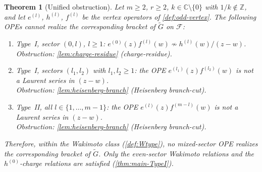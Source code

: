 \documentclass[12pt]{article}
\theoremstyle{plain}
\newtheorem{theorem}{Theorem}[section]
\theoremstyle{definition}
\theoremstyle{remark}
\newcommand{\C}{\mathbb{C}}
\newcommand{\el}[1]{e^{(#1)}}
\newcommand{\hl}[1]{h^{(#1)}}
\newcommand{\fl}[1]{f^{(#1)}}
\newcommand{\OPE}{\sim}
\begin{document}
\begin{theorem}[Unified obstruction]
\label{thm:unified-nogo}
  Let $m\geq 2$, $r\geq 2$, $k\in\C\setminus\{0\}$ with $1/k\notin\mathbb{Z}$,
  and let $\el{l}$, $\hl{l}$, $\fl{l}$ be the vertex operators of
  \cref{def:odd-vertex}.
  The following OPEs \emph{cannot} realize the corresponding bracket of
  $\widetilde{G}$ on $\mathcal{F}$:
  \begin{enumerate}[label=\textup{(\Alph*)}]
    \item\label{nogo-A}
      \emph{Type~I, sector $(0,l)$, $l\geq 1$:}
      $\el{0}(z)\fl{l}(w)\not\OPE \hl{l}(w)/(z-w)$.\\
      Obstruction: \cref{lem:charge-residue} (charge-residue).
    \item\label{nogo-B}
      \emph{Type~I, sectors $(l_1,l_2)$ with $l_1,l_2\geq 1$:}
      the OPE $\el{l_1}(z)\fl{l_2}(w)$ is not a Laurent series in $(z-w)$.\\
      Obstruction: \cref{lem:heisenberg-branch} (Heisenberg branch-cut).
    \item\label{nogo-C}
      \emph{Type~II, all $l\in\{1,\ldots,m-1\}$:}
      the OPE $\el{l}(z)\fl{m-l}(w)$ is not a Laurent series in $(z-w)$.\\
      Obstruction: \cref{lem:heisenberg-branch} (Heisenberg branch-cut).
  \end{enumerate}
  Therefore, within the Wakimoto class \textup{(\cref{def:Wtype})},
  no mixed-sector OPE realizes the corresponding bracket of $\widetilde{G}$.
  Only the even-sector Wakimoto relations and the $h^{(0)}$-charge relations
  are satisfied \textup{(\cref{thm:main-TypeI})}.
\end{theorem}
\end{document}
